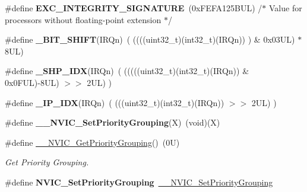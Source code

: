 \begin{DoxyCompactItemize}
\mbox{\label{group___c_m_s_i_s___core___n_v_i_c_functions_ga7d1b21b2d863ccd9e23a3295b3173155}} 
\#define {\bfseries E\+X\+C\+\_\+\+I\+N\+T\+E\+G\+R\+I\+T\+Y\+\_\+\+S\+I\+G\+N\+A\+T\+U\+RE}~(0x\+F\+E\+F\+A125\+B\+U\+L)     /$\ast$ Value for processors without floating-\/point extension                $\ast$/
\item 
\mbox{\label{group___c_m_s_i_s___core___n_v_i_c_functions_ga53c75b28823441c6153269f0ecbed878}} 
\#define {\bfseries \+\_\+\+B\+I\+T\+\_\+\+S\+H\+I\+FT}(I\+R\+Qn)~(  ((((uint32\+\_\+t)(int32\+\_\+t)(I\+R\+Qn))         )      \&  0x03\+U\+L) $\ast$ 8\+U\+L)
\item 
\mbox{\label{group___c_m_s_i_s___core___n_v_i_c_functions_gaee4f7eb5d7e770ad51489dbceabb1755}} 
\#define {\bfseries \+\_\+\+S\+H\+P\+\_\+\+I\+DX}(I\+R\+Qn)~( (((((uint32\+\_\+t)(int32\+\_\+t)(I\+R\+Qn)) \& 0x0\+F\+U\+L)-\/8\+U\+L) $>$$>$    2\+U\+L)      )
\item 
\mbox{\label{group___c_m_s_i_s___core___n_v_i_c_functions_ga370ec4b1751a6a889d849747df3763a9}} 
\#define {\bfseries \+\_\+\+I\+P\+\_\+\+I\+DX}(I\+R\+Qn)~(   (((uint32\+\_\+t)(int32\+\_\+t)(I\+R\+Qn))                $>$$>$    2\+U\+L)      )
\item 
\mbox{\label{group___c_m_s_i_s___core___n_v_i_c_functions_ga6834dd8c9c59394f1b544b57665293a4}} 
\#define {\bfseries \+\_\+\+\_\+\+N\+V\+I\+C\+\_\+\+Set\+Priority\+Grouping}(X)~(void)(X)
\item 
\#define \hyperlink{group___c_m_s_i_s___core___n_v_i_c_functions_gae1de06155d072758b3453edb07d12459}{\+\_\+\+\_\+\+N\+V\+I\+C\+\_\+\+Get\+Priority\+Grouping}()~(0\+U)
\begin{DoxyCompactList}\small\item\em Get Priority Grouping. \end{DoxyCompactList}\item 
\mbox{\label{group___c_m_s_i_s___core___n_v_i_c_functions_ga0e798d5aec68cdd8263db86a76df788f}} 
\#define {\bfseries N\+V\+I\+C\+\_\+\+Set\+Priority\+Grouping}~\hyperlink{group___c_m_s_i_s___core___n_v_i_c_functions_gafc94dcbaee03e4746ade1f5bb9aaa56d}{\+\_\+\+\_\+\+N\+V\+I\+C\+\_\+\+Set\+Priority\+Grouping}

\end{DoxyCompactItemize}
